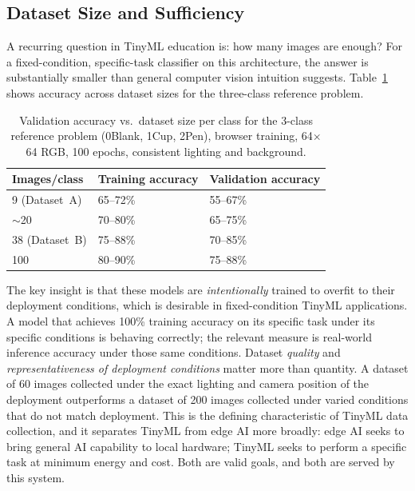 \documentclass[11pt]{article}
\begin{document}
\subsection{Dataset Size and Sufficiency}
\label{sec:deployment_philosophy}

A recurring question in TinyML education is: how many images are enough? For a
fixed-condition, specific-task classifier on this architecture, the answer is
substantially smaller than general computer vision intuition suggests.
Table~\ref{tab:datasize} shows accuracy across dataset sizes for the three-class
reference problem.

\begin{table}[h]
\centering
\caption{Validation accuracy vs.\ dataset size per class for the 3-class reference
         problem (0Blank, 1Cup, 2Pen), browser training, 64$\times$64 RGB,
         100 epochs, consistent lighting and background.}
\label{tab:datasize}
\begin{tabular}{@{}lll@{}}
\toprule
\textbf{Images/class} & \textbf{Training accuracy} & \textbf{Validation accuracy} \\
\midrule
9  (Dataset~A)         & 65--72\% & 55--67\% \\
$\sim$20               & 70--80\% & 65--75\% \\
38 (Dataset~B)         & 75--88\% & 70--85\% \\
100                    & 80--90\% & 75--88\% \\
\bottomrule
\end{tabular}
\end{table}

The key insight is that these models are \emph{intentionally} trained to overfit to
their deployment conditions, which is desirable in fixed-condition TinyML applications.
A model that achieves 100\% training accuracy on its specific task under its specific
conditions is behaving correctly; the relevant measure is real-world inference accuracy
under those same conditions. Dataset \emph{quality} and \emph{representativeness of
deployment conditions} matter more than quantity. A dataset of 60 images collected
under the exact lighting and camera position of the deployment outperforms a dataset
of 200 images collected under varied conditions that do not match deployment. This is
the defining characteristic of TinyML data collection, and it separates TinyML from
edge AI more broadly: edge AI seeks to bring general AI capability to local hardware;
TinyML seeks to perform a specific task at minimum energy and cost. Both are valid
goals, and both are served by this system.
\end{document}
